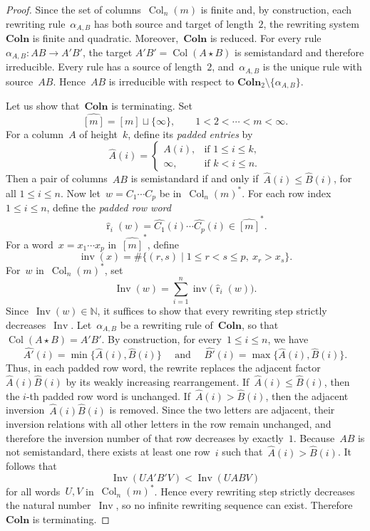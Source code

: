 \documentclass[a4paper, twoside, 11pt, english]{article}
\theoremstyle{plain}
\theoremstyle{definition}
\newcommand{\fl}{\rightarrow}
\DeclareMathOperator{\col}{Col}
\DeclareMathOperator{\rowword}{r}
\newcommand{\Colo}{\mathbf{Coln}}
\newcommand{\inv}{\operatorname{inv}}
\newcommand{\Inv}{\operatorname{Inv}}
\begin{document}
\begin{proof}
Since the set of columns~$\col_n(m)$ is finite and, by construction, each rewriting rule~$\alpha_{A,B}$ has both source and target of length~$2$, the rewriting system~$\Colo$ is finite and quadratic.
Moreover,~$\Colo$ is reduced. For every rule
$\alpha_{A,B}:AB\fl A'B'$, the target
$A'B'=\col(A\star B)$ is semistandard and therefore irreducible.
Every rule has a source of length~$2$, and~$\alpha_{A,B}$
is the unique rule with source~$AB$.
Hence~$AB$ is irreducible with respect to
$\Colo_2\setminus\{\alpha_{A,B}\}$.

Let us show that~$\Colo$ is terminating.
Set
\[
\widehat{[m]}=[m]\sqcup\{\infty\},
\qquad
1<2<\cdots<m<\infty .
\]
For a column~$A$ of height~$k$, define its \emph{padded entries} by
\[
\widehat{A}(i)=
\begin{cases}
A(i), & \text{if } 1\le i\le k,\\
\infty, & \text{if } k<i\le n.
\end{cases}
\]
Then a pair of columns~$AB$ is semistandard if and only if~$\widehat{A}(i)\le \widehat{B}(i)$, for all  $1\le i\le n$.
Now let~$w=C_1\cdots C_p$ be in~$\col_n(m)^\ast$.
For each row index~$1\le i\le n$, define the \emph{padded row word}
\[
\widehat{\rowword}_i(w)
=
\widehat{C_1}(i)\cdots \widehat{C_p}(i)
\in \widehat{[m]}^\ast.
\]
For a word~$x=x_1\cdots x_p$ in~$\widehat{[m]}^\ast$, define
\[
\inv(x)
=
\#\{(r,s)\mid 1\le r<s\le p,\ x_r>x_s\}.
\]
For~$w$ in~$\col_n(m)^\ast$, set
\[
\Inv(w)
=
\sum_{i=1}^{n}\inv\bigl(\widehat{\rowword}_i(w)\bigr).
\]
Since~$\Inv(w)\in\mathbb N$, it suffices to show that every rewriting step strictly decreases~$\Inv$.
Let~$\alpha_{A,B}$ be a rewriting rule of~$\Colo$, so that~$\col(A\star B)=A'B'$.
By construction, for every~$1\le i\le n$, we have
\[
\widehat{A'}(i)=\min\{\widehat{A}(i),\widehat{B}(i)\}\quad\text{ and }\quad \widehat{B'}(i)=\max\{\widehat{A}(i),\widehat{B}(i)\}.
\]
Thus, in each padded row word, the rewrite replaces the adjacent factor~$\widehat{A}(i)\widehat{B}(i)$
by its weakly increasing rearrangement.
If~$\widehat{A}(i)\le \widehat{B}(i)$, then the $i$-th padded row word is unchanged.
If~$\widehat{A}(i)>\widehat{B}(i)$, then the adjacent inversion~$\widehat{A}(i)\widehat{B}(i)$
is removed. Since the two letters are adjacent, their inversion relations with all other letters in the row remain unchanged, and therefore the inversion number of that row decreases by exactly~$1$.
Because~$AB$ is not semistandard, there exists at least one row~$i$ such that~$\widehat{A}(i)>\widehat{B}(i)$.
It follows that
\[
\Inv(UA'B'V)<\Inv(UABV)
\]
for all words~$U,V$ in~$\col_n(m)^\ast$.
Hence every rewriting step strictly decreases the natural number~$\Inv$, so no infinite rewriting sequence can exist.
Therefore~$\Colo$ is terminating.


\end{proof}
\end{document}
